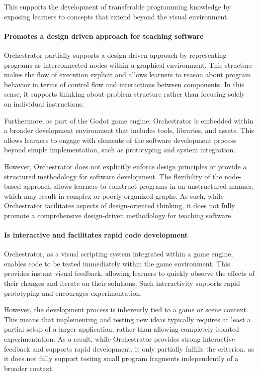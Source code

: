 This supports the development of transferable programming knowledge by exposing learners to concepts that extend beyond the visual environment.

\paragraph{Promotes a design driven approach for teaching software}

Orchestrator partially supports a design-driven approach by representing programs as interconnected nodes within a graphical environment.
This structure makes the flow of execution explicit and allows learners to reason about program behavior in terms of control flow and interactions between components.
In this sense, it supports thinking about problem structure rather than focusing solely on individual instructions.

Furthermore, as part of the Godot game engine, Orchestrator is embedded within a broader development environment that includes tools, libraries, and assets.
This allows learners to engage with elements of the software development process beyond simple implementation, such as prototyping and system integration.

However, Orchestrator does not explicitly enforce design principles or provide a structured methodology for software development.
The flexibility of the node-based approach allows learners to construct programs in an unstructured manner, which may result in complex or poorly organized graphs.
As such, while Orchestrator facilitates aspects of design-oriented thinking, it does not fully promote a comprehensive design-driven methodology for teaching software.

\paragraph{Is interactive and facilitates rapid code development}

Orchestrator, as a visual scripting system integrated within a game engine, enables code to be tested immediately within the game environment.
This provides instant visual feedback, allowing learners to quickly observe the effects of their changes and iterate on their solutions.
Such interactivity supports rapid prototyping and encourages experimentation.

However, the development process is inherently tied to a game or scene context.
This means that implementing and testing new ideas typically requires at least a partial setup of a larger application, rather than allowing completely isolated experimentation.
As a result, while Orchestrator provides strong interactive feedback and supports rapid development, it only partially fulfills the criterion, as it does not fully support testing small program fragments independently of a broader context.

